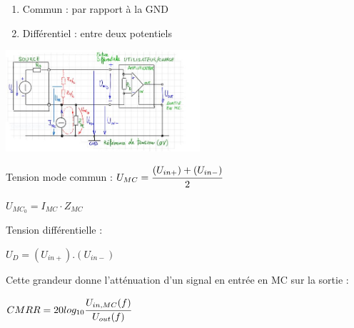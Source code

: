 
\begin{enumerate}
    \item Commun : par rapport à la GND
    \item Différentiel : entre deux potentiels 
\end{enumerate}



\vspace{5mm}

\begin{center}
    \includegraphics[width = 0.54\textwidth]{img/Schéma.JPG}
\end{center}

Tension mode commun : 
{\hfill$ U_{MC}  = \cfrac{(U_{in+})+(U_{in-})}{2}$ \hfill}

{\hfill$ U_{MC_0}  = I_{MC} \cdot Z_{MC}$ \hfill}

Tension différentielle : 

{\hfill$ U_{D}  = (U_{in+}).(U_{in-})$ \hfill}


Cette grandeur donne l’atténuation d’un signal en entrée en MC sur la sortie :

{\hfill$ CMRR = 20log_{10}\cfrac{U_{in,MC}(f)}{U_{out}(f)}$ \hfill}

\hformbar


